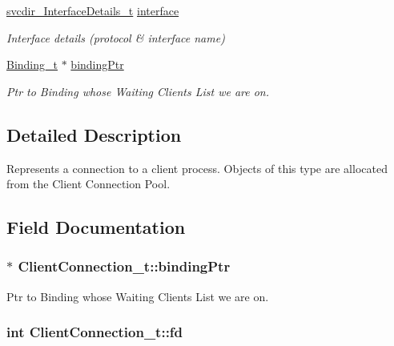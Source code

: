 \begin{DoxyCompactItemize}
\hyperlink{structsvcdir___interface_details__t}{svcdir\+\_\+\+Interface\+Details\+\_\+t} \hyperlink{struct_client_connection__t_a8e22e27997e461cce0dc4a51fc2b9fba}{interface}
\begin{DoxyCompactList}\small\item\em Interface details (protocol \& interface name) \end{DoxyCompactList}\item 
\hyperlink{struct_binding__t}{Binding\+\_\+t} $\ast$ \hyperlink{struct_client_connection__t_a50b1d981e958666c994395954882ddee}{binding\+Ptr}
\begin{DoxyCompactList}\small\item\em Ptr to Binding whose Waiting Clients List we are on. \end{DoxyCompactList}\end{DoxyCompactItemize}


\subsection{Detailed Description}
Represents a connection to a client process. Objects of this type are allocated from the Client Connection Pool. 

\subsection{Field Documentation}
\subsubsection[{\texorpdfstring{binding\+Ptr}{bindingPtr}}]{$\ast$ Client\+Connection\+\_\+t\+::binding\+Ptr}\hypertarget{struct_client_connection__t_a50b1d981e958666c994395954882ddee}{}\label{struct_client_connection__t_a50b1d981e958666c994395954882ddee}


Ptr to Binding whose Waiting Clients List we are on. 

\subsubsection[{\texorpdfstring{fd}{fd}}]{\setlength{\rightskip}{0pt plus 5cm}int Client\+Connection\+\_\+t\+::fd}\hypertarget{struct_client_connection__t_a7aeb2d0e7d5277f259b6c20e682ffc12}{}\label{struct_client_connection__t_a7aeb2d0e7d5277f259b6c20e682ffc12}


